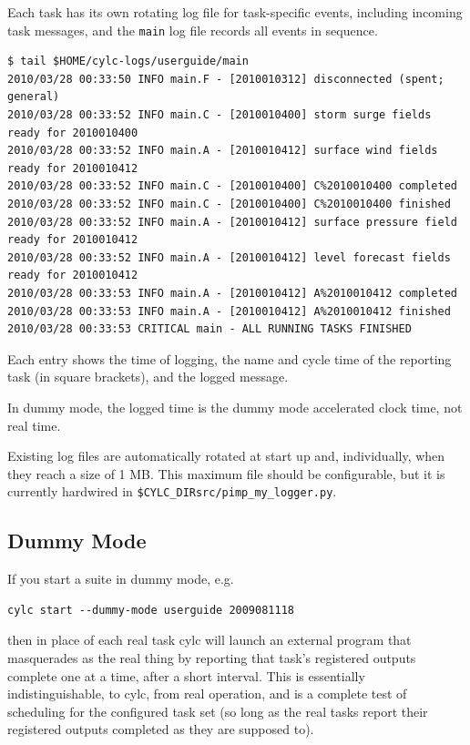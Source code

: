 \documentclass[11pt,a4paper]{article}
\begin{document}
Each task has its own rotating log file for task-specific events,
including incoming task messages, and the \lstinline=main= log file
records all events in sequence.

\begin{lstlisting}
$ tail $HOME/cylc-logs/userguide/main
2010/03/28 00:33:50 INFO main.F - [2010010312] disconnected (spent; general)
2010/03/28 00:33:52 INFO main.C - [2010010400] storm surge fields ready for 2010010400
2010/03/28 00:33:52 INFO main.A - [2010010412] surface wind fields ready for 2010010412
2010/03/28 00:33:52 INFO main.C - [2010010400] C%2010010400 completed
2010/03/28 00:33:52 INFO main.C - [2010010400] C%2010010400 finished
2010/03/28 00:33:52 INFO main.A - [2010010412] surface pressure field ready for 2010010412
2010/03/28 00:33:52 INFO main.A - [2010010412] level forecast fields ready for 2010010412
2010/03/28 00:33:53 INFO main.A - [2010010412] A%2010010412 completed
2010/03/28 00:33:53 INFO main.A - [2010010412] A%2010010412 finished
2010/03/28 00:33:53 CRITICAL main - ALL RUNNING TASKS FINISHED
\end{lstlisting}


Each entry shows the time of logging, the name and cycle time of the
reporting task (in square brackets), and the logged message.

In dummy mode, the logged time is the dummy mode accelerated clock time, not 
real time.

Existing log files are automatically rotated at start up and,
individually, when they reach a size of 1 MB.  This maximum file 
should be configurable, but it is currently hardwired in
\lstinline=$CYLC_DIRsrc/pimp_my_logger.py=.

\subsection{Dummy Mode} 
\label{DummyMode}

If you start a suite in dummy mode, e.g.\:

\begin{lstlisting}
cylc start --dummy-mode userguide 2009081118
\end{lstlisting}

then in place of each real task cylc will launch an external program
that masquerades as the real thing by reporting that task's registered
outputs complete one at a time, after a short interval. This is
essentially indistinguishable, to cylc, from real operation, and is a
complete test of scheduling for the configured task set (so long as the
real tasks report their registered outputs completed as they are
supposed to). 
\end{document}
